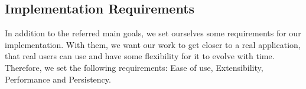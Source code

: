 









\subsection{Implementation Requirements} %
\label{reqs:Implementation_Requirements}

In addition to the referred main goals, we set ourselves some requirements for our implementation. With them, we want our work to get closer to a real application, that real users can use and have some flexibility for it to evolve with time.
Therefore, we set the following requirements: Ease of use, Extensibility, Performance and Persistency.

